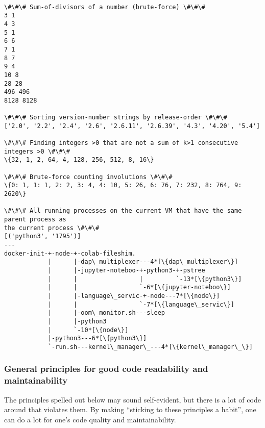 \documentclass[11pt]{article}
\begin{document}
    \begin{Verbatim}[commandchars=\\\{\}]

\#\#\# Sum-of-divisors of a number (brute-force) \#\#\#
3 1
4 3
5 1
6 6
7 1
8 7
9 4
10 8
28 28
496 496
8128 8128

\#\#\# Sorting version-number strings by release-order \#\#\#
['2.0', '2.2', '2.4', '2.6', '2.6.11', '2.6.39', '4.3', '4.20', '5.4']

\#\#\# Finding integers >0 that are not a sum of k>1 consecutive integers >0 \#\#\#
\{32, 1, 2, 64, 4, 128, 256, 512, 8, 16\}

\#\#\# Brute-force counting involutions \#\#\#
\{0: 1, 1: 1, 2: 2, 3: 4, 4: 10, 5: 26, 6: 76, 7: 232, 8: 764, 9: 2620\}

\#\#\# All running processes on the current VM that have the same parent process as
the current process \#\#\#
[('python3', '1795')]
---
docker-init-+-node-+-colab-fileshim.
            |      |-dap\_multiplexer---4*[\{dap\_multiplexer\}]
            |      |-jupyter-noteboo-+-python3-+-pstree
            |      |                 |         `-13*[\{python3\}]
            |      |                 `-6*[\{jupyter-noteboo\}]
            |      |-language\_servic-+-node---7*[\{node\}]
            |      |                 `-7*[\{language\_servic\}]
            |      |-oom\_monitor.sh---sleep
            |      |-python3
            |      `-10*[\{node\}]
            |-python3---6*[\{python3\}]
            `-run.sh---kernel\_manager\_---4*[\{kernel\_manager\_\}]
    \end{Verbatim}

    \hypertarget{general-principles-for-good-code-readability-and-maintainability}{%
\subsubsection{General principles for good code readability and
maintainability}\label{general-principles-for-good-code-readability-and-maintainability}}

The principles spelled out below may sound self-evident, but there is a
lot of code around that violates them. By making ``sticking to these
principles a habit'', one can do a lot for one's code quality and
maintainability.
\end{document}
